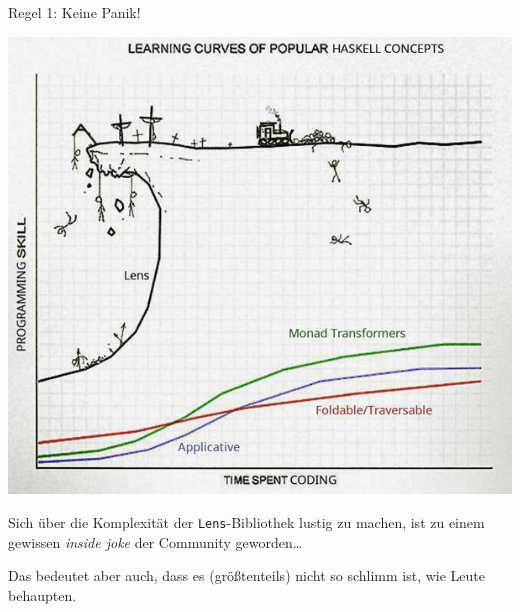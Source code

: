 \documentclass{beamer}
\begin{document}

\begin{frame}

\Large
Regel 1: Keine Panik!
\normalsize
\pause

\begin{multicols}{2}

\begin{center}
\includegraphics[scale=0.25]{learning_curve.jpg} 
\end{center}

\columnbreak
\quad


Sich über die Komplexität der \texttt{Lens}-Bibliothek lustig zu machen, ist zu einem gewissen \emph{inside joke} der Community geworden\dots
\pause
\bigskip

Das bedeutet aber auch, dass es (größtenteils) nicht so schlimm ist, wie Leute behaupten.

\end{multicols}

\end{frame}

\end{document}
